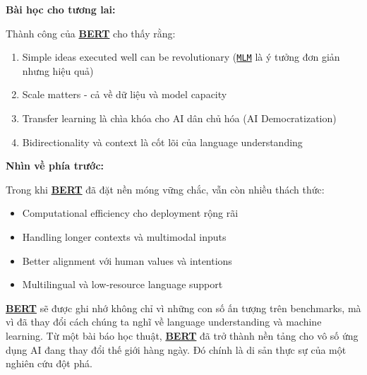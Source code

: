 \textbf{Bài học cho tương lai:}

Thành công của \hyperref[acro:bert]{\textbf{BERT}} cho thấy rằng:
\begin{enumerate}
    \item Simple ideas executed well can be revolutionary (\hyperref[acro:mlm]{\texttt{MLM}} là ý tưởng đơn giản nhưng hiệu quả)
    \item Scale matters - cả về dữ liệu và model capacity
    \item Transfer learning là chìa khóa cho AI dân chủ hóa (AI Democratization)
    \item Bidirectionality và context là cốt lõi của language understanding
\end{enumerate}

\textbf{Nhìn về phía trước:}

Trong khi \hyperref[acro:bert]{\textbf{BERT}} đã đặt nền móng vững chắc, vẫn còn nhiều thách thức:
\begin{itemize}
    \item Computational efficiency cho deployment rộng rãi
    \item Handling longer contexts và multimodal inputs
    \item Better alignment với human values và intentions
    \item Multilingual và low-resource language support
\end{itemize}

\hyperref[acro:bert]{\textbf{BERT}} sẽ được ghi nhớ không chỉ
vì những con số ấn tượng trên benchmarks, mà vì đã thay đổi cách chúng ta nghĩ về language understanding và machine learning.
Từ một bài báo học thuật, \hyperref[acro:bert]{\textbf{BERT}} đã trở thành nền tảng cho vô số ứng dụng AI đang thay đổi thế giới hàng ngày.
Đó chính là di sản thực sự của một nghiên cứu đột phá.
